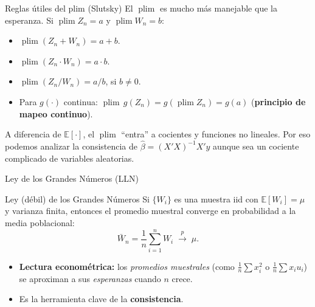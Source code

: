 \documentclass{beamer}
\DeclareMathOperator*{\plim}{plim}
\begin{document}
\begin{frame}{Reglas útiles del plim (Slutsky)}
    El $\plim$ es mucho más manejable que la esperanza. Si $\plim Z_n = a$ y $\plim W_n = b$:
    \begin{itemize}
        \item $\plim(Z_n + W_n) = a + b$.
        \pause
        \item $\plim(Z_n \cdot W_n) = a \cdot b$.
        \pause
        \item $\plim(Z_n / W_n) = a / b$, \; si $b\neq 0$.
        \pause
        \item Para $g(\cdot)$ continua: $\plim\, g(Z_n) = g(\plim Z_n) = g(a)$ \;(\textbf{principio de mapeo continuo}).
    \end{itemize}
    \pause
    \begin{tcolorbox}[colback=blue!5!white, colframe=blue!75!black, title=¿Por qué importa?]
    A diferencia de $\mathbb{E}[\cdot]$, el $\plim$ ``entra'' a cocientes y funciones no lineales. Por eso podemos analizar la consistencia de $\hat{\beta}=(X'X)^{-1}X'y$ aunque sea un cociente complicado de variables aleatorias.
    \end{tcolorbox}
\end{frame}

\begin{frame}{Ley de los Grandes Números (LLN)}
    \begin{alertblock}{Ley (débil) de los Grandes Números}
    Si $\{W_i\}$ es una muestra iid con $\mathbb{E}[W_i]=\mu$ y varianza finita, entonces el promedio muestral converge en probabilidad a la media poblacional:
    \[
    \bar{W}_n = \frac{1}{n}\sum_{i=1}^n W_i \;\overset{p}{\to}\; \mu.
    \]
    \end{alertblock}
    \pause
    \begin{itemize}
        \item \textbf{Lectura econométrica:} los \emph{promedios muestrales} (como $\tfrac{1}{n}\sum x_i^2$ o $\tfrac{1}{n}\sum x_i u_i$) se aproximan a sus \emph{esperanzas} cuando $n$ crece.
        \item Es la herramienta clave de la \textbf{consistencia}.
    \end{itemize}
\end{frame}
\end{document}
